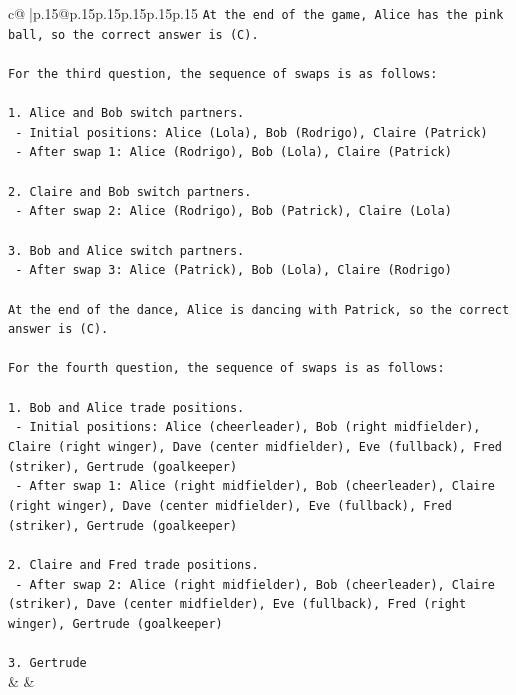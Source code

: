 \documentclass{article}
\begin{document}
{\begin{supertabular}{c@{$\;$}|p{.15\linewidth}@{}p{.15\linewidth}p{.15\linewidth}p{.15\linewidth}p{.15\linewidth}p{.15\linewidth}}
{{{\texttt{At the end of the game, Alice has the pink ball, so the correct answer is (C).} \\
\\ 
\texttt{For the third question, the sequence of swaps is as follows:} \\
\\ 
\texttt{1. Alice and Bob switch partners.} \\
\texttt{   {-} Initial positions: Alice (Lola), Bob (Rodrigo), Claire (Patrick)} \\
\texttt{   {-} After swap 1: Alice (Rodrigo), Bob (Lola), Claire (Patrick)} \\
\\ 
\texttt{2. Claire and Bob switch partners.} \\
\texttt{   {-} After swap 2: Alice (Rodrigo), Bob (Patrick), Claire (Lola)} \\
\\ 
\texttt{3. Bob and Alice switch partners.} \\
\texttt{   {-} After swap 3: Alice (Patrick), Bob (Lola), Claire (Rodrigo)} \\
\\ 
\texttt{At the end of the dance, Alice is dancing with Patrick, so the correct answer is (C).} \\
\\ 
\texttt{For the fourth question, the sequence of swaps is as follows:} \\
\\ 
\texttt{1. Bob and Alice trade positions.} \\
\texttt{   {-} Initial positions: Alice (cheerleader), Bob (right midfielder), Claire (right winger), Dave (center midfielder), Eve (fullback), Fred (striker), Gertrude (goalkeeper)} \\
\texttt{   {-} After swap 1: Alice (right midfielder), Bob (cheerleader), Claire (right winger), Dave (center midfielder), Eve (fullback), Fred (striker), Gertrude (goalkeeper)} \\
\\ 
\texttt{2. Claire and Fred trade positions.} \\
\texttt{   {-} After swap 2: Alice (right midfielder), Bob (cheerleader), Claire (striker), Dave (center midfielder), Eve (fullback), Fred (right winger), Gertrude (goalkeeper)} \\
\\ 
\texttt{3. Gertrude} \\
            }
        }
    }
    & & \\ \\


\end{supertabular}}
\end{document}
